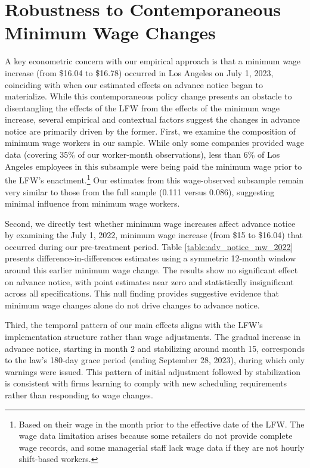 \documentclass[letterpaper,11pt,leqno]{article}
\theoremstyle{paper}
\begin{document}
\newpage

\section{Robustness to Contemporaneous Minimum Wage Changes} \label{sec:min_wage_changes}

A key econometric concern with our empirical approach is that a minimum wage increase (from \$16.04 to \$16.78) occurred in Los Angeles on July 1, 2023, coinciding with when our estimated effects on advance notice began to materialize. While this contemporaneous policy change presents an obstacle to disentangling the effects of the LFW from the effects of the minimum wage increase, several empirical and contextual factors suggest the changes in advance notice are primarily driven by the former. 
First, we examine the composition of minimum wage workers in our sample. While only some companies provided wage data (covering 35\% of our worker-month observations), less than 6\% of Los Angeles employees in this subsample were being paid the minimum wage prior to the LFW's enactment.\footnote{Based on their wage in the month prior to the effective date of the LFW. The wage data limitation arises because some retailers do not provide complete wage records, and some managerial staff lack wage data if they are not hourly shift-based workers.} Our estimates from this wage-observed subsample remain very similar to those from the full sample (0.111 versus 0.086), suggesting minimal influence from minimum wage workers.

Second, we directly test whether minimum wage increases affect advance notice by examining the July 1, 2022, minimum wage increase (from \$15 to \$16.04) that occurred during our pre-treatment period. Table \ref{table:adv_notice_mw_2022} presents difference-in-differences estimates using a symmetric 12-month window around this earlier minimum wage change. The results show no significant effect on advance notice, with point estimates near zero and statistically insignificant across all specifications. This null finding provides suggestive evidence that minimum wage changes alone do not drive changes to advance notice.

Third, the temporal pattern of our main effects aligns with the LFW's implementation structure rather than wage adjustments. The gradual increase in advance notice, starting in month 2 and stabilizing around month 15, corresponds to the law's 180-day grace period (ending September 28, 2023), during which only warnings were issued. This pattern of initial adjustment followed by stabilization is consistent with firms learning to comply with new scheduling requirements rather than responding to wage changes.
\end{document}
